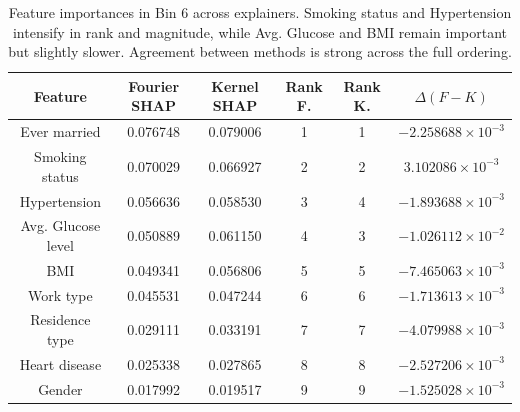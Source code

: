 \documentclass[letterpaper,11pt]{article}
\numberwithin{equation}{section}
\numberwithin{equation}{section}
\begin{document}
\begin{table}[H]
    \centering
    \begin{tabular}{|c||c|c|c|c|c|} \hline 
         Feature & Fourier SHAP & Kernel SHAP & Rank F. & Rank K. & $\Delta (F-K) $ \\ \hline \hline          
        Ever married & 0.076748 & 0.079006 & 1 & 1 & $-2.258688\times 10^{-3}$ \\ \hline 
        Smoking status & 0.070029 &	0.066927 & 2 & 2 & $3.102086\times 10^{-3}$ \\ \hline 
        Hypertension & 0.056636 & 0.058530 & 3 & 4 & $-1.893688 \times 10^{-3}$ \\ \hline 
        Avg. Glucose level & 0.050889 &	0.061150 & 4 & 3 & $-1.026112\times 10^{-2}$ \\ \hline 
        BMI & 0.049341 & 0.056806 &	5 &	5 & $-7.465063 \times 10^{-3}$ \\ \hline 
        Work type &	0.045531 & 0.047244 & 6 & 6 &	$-1.713613\times 10^{-3}$ \\ \hline 
        Residence type & 0.029111 &	0.033191 & 7 & 7 &$-4.079988\times 10^{-3}$ \\ \hline 
        Heart disease &	0.025338 &	0.027865 &	8 &	8 &	$-2.527206\times 10^{-3}$ \\ \hline 
        Gender & 0.017992 &	0.019517 & 9 & 9 &	$-1.525028\times 10^{-3}$ \\ \hline 
    \end{tabular}
    \caption{Feature importances in Bin 6 across explainers. Smoking status and Hypertension intensify in rank and magnitude, while Avg. Glucose and BMI remain important but slightly slower. Agreement between methods is strong across the full ordering.}
\end{table}
\end{document}
